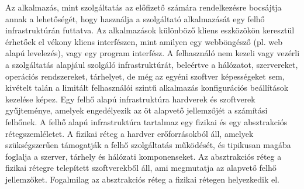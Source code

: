 Az alkalmazás, mint szolgáltatás az előfizető számára rendelkezésre bocsájtja annak a lehetőségét, hogy használja a szolgáltató alkalmazását egy felhő infrastruktúrán futtatva. Az alkalmazások különböző kliens eszközökön keresztül érhetőek el vékony kliens interfészen, mint amilyen egy webböngésző (pl. web alapú levelezés), vagy egy program interfész. A felhasználó nem kezeli vagy vezérli a szolgáltatás alapjául szolgáló infrastruktúrát, beleértve a hálózatot, szervereket, operációs rendszereket, tárhelyet, de még az egyéni szoftver képességeket sem, kivételt talán a limitált felhasználói szintű alkalmazás konfigurációs beállítások kezelése képez. Egy felhő alapú infrastruktúra hardverek és szoftverek gyűjteménye, amelyek engedélyezik az öt alapvető jellemzőjét a számítási felhőnek. A felhő alapú infrastruktúra tartalmaz egy fizikai és egy absztrakciós rétegszemléletet. A fizikai réteg a hardver erőforrásokból áll, amelyek szükségszerűen támogatják a felhő szolgáltatás működését, és tipikusan magába foglalja a szerver, tárhely és hálózati komponenseket. Az absztrakciós réteg a fizikai rétegre telepített szoftverekből áll, ami megmutatja az alapvető felhő jellemzőket. Fogalmilag az absztrakciós réteg a fizikai rétegen helyezkedik el.\cite{nistsp800-145} 

